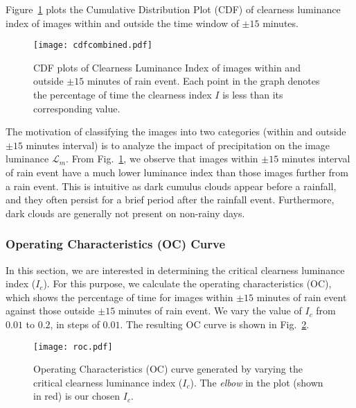 Figure~\ref{fig:cdf} plots the Cumulative Distribution Plot (CDF) of clearness luminance index of images within and outside the time window of $\pm 15$ minutes. 

\begin{figure}[htb]
\centering
\texttt{[image: cdfcombined.pdf]}
\caption[CDF plots of Clearness Luminance Index of images within and outside $\pm 15$ minutes of rain event.]{CDF plots of Clearness Luminance Index of images within and outside $\pm 15$ minutes of rain event. Each point in the graph denotes the percentage of time the clearness index $I$ is less than its corresponding value.} 
\label{fig:cdf}
\end{figure}

The motivation of classifying the images into two categories (within and outside $\pm 15$ minutes interval) is to analyze the impact of precipitation on the image luminance $\mathcal{L}_m$.
From Fig.~\ref{fig:cdf}, we observe that images within $\pm 15$ minutes interval of rain event have a much lower luminance index than those images further from a rain event. This is intuitive as dark cumulus clouds appear before a rainfall, and they often persist for a brief period after the rainfall event. Furthermore, dark clouds are generally not present on non-rainy days.

\subsubsection{Operating Characteristics (OC) Curve}
In this section, we are interested in determining the critical clearness luminance index ($I_c$). For this purpose, we calculate the operating characteristics (OC), which shows the percentage of time for images within $\pm 15$ minutes of rain event against those  outside $\pm 15$ minutes of rain event. We vary the value of $I_c$ from $0.01$ to $0.2$, in steps of $0.01$. The resulting OC curve is shown in Fig.~\ref{fig:roc}.

\begin{figure}[htb]
\centering
\texttt{[image: roc.pdf]}
\caption[Operating Characteristics (OC) curve generated by varying the critical clearness luminance index ($I_c$).]{Operating Characteristics (OC) curve generated by varying the critical clearness luminance index ($I_c$). The \emph{elbow} in the plot (shown in red) is our chosen $I_c$.} 
\label{fig:roc}
\end{figure}

